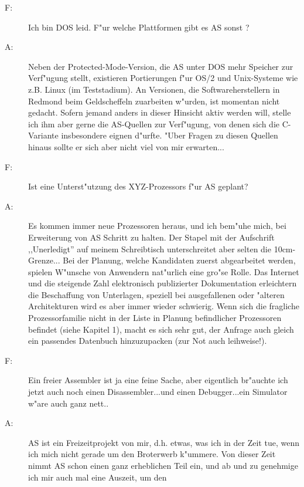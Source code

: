 \documentclass[12pt,a4paper,twoside]{report}
\begin{document}
{\begin{description}
\item[F:]{Ich bin DOS leid.  F"ur welche Plattformen gibt es AS sonst ?}
\item[A:]{Neben der Protected-Mode-Version, die AS unter DOS mehr Speicher
         zur Verf"ugung stellt, existieren Portierungen f"ur OS/2 und
         Unix-Systeme wie z.B. Linux (im Teststadium).  An Versionen,
         die Softwareherstellern in Redmond beim Geldscheffeln zuarbeiten
         w"urden, ist momentan nicht gedacht.  Sofern jemand anders in
         dieser Hinsicht aktiv werden will, stelle ich ihm aber gerne
         die AS-Quellen zur Verf"ugung, von denen sich die C-Variante
         insbesondere eignen d"urfte.  "Uber Fragen zu diesen Quellen
         hinaus sollte er sich aber nicht viel von mir erwarten...}
\vspace{0.3cm}
\item[F:]{Ist eine Unterst"utzung des XYZ-Prozessors f"ur AS geplant?}
\item[A:]{Es kommen immer neue Prozessoren heraus, und ich bem"uhe
         mich, bei Erweiterung von AS Schritt zu halten.  Der Stapel
         mit der Aufschrift ,,Unerledigt'' auf meinem Schreibtisch
         unterschreitet aber selten die 10cm-Grenze... Bei der Planung,
         welche Kandidaten zuerst abgearbeitet werden, spielen W"unsche
         von Anwendern nat"urlich eine gro"se Rolle.  Das Internet und
         die steigende Zahl elektronisch publizierter Dokumentation
         erleichtern die Beschaffung von Unterlagen, speziell bei
         ausgefallenen oder "alteren Architekturen wird es aber immer
         wieder schwierig.  Wenn sich die fragliche Prozessorfamilie
         nicht in der Liste in Planung befindlicher Prozessoren
         befindet (siehe Kapitel 1), macht es sich sehr gut, der
         Anfrage auch gleich ein passendes Datenbuch hinzuzupacken
         (zur Not auch leihweise!).}
\vspace{0.3cm}
\item[F:]{Ein freier Assembler ist ja eine feine Sache, aber eigentlich
         br"auchte ich jetzt auch noch einen Disassembler...und einen
         Debugger...ein Simulator w"are auch ganz nett..}
\item[A:]{AS ist ein Freizeitprojekt von mir, d.h. etwas, was ich in der
         Zeit tue, wenn ich mich nicht gerade um den Broterwerb k"ummere.
         Von dieser Zeit nimmt AS schon einen ganz erheblichen Teil ein,
         und ab und zu genehmige ich mir auch mal eine Auszeit, um den
}
\end{description}}
\end{document}
